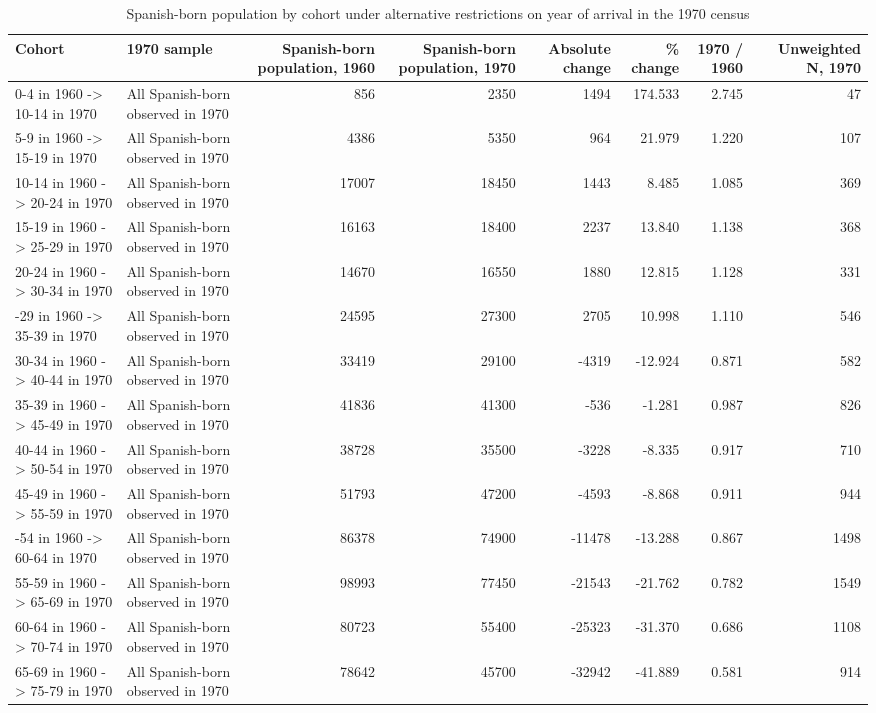 \begin{table}

\caption{Spanish-born population by cohort under alternative restrictions on year of arrival in the 1970 census}
\centering
\begin{tabular}[t]{llrrrrrr}
\toprule
Cohort & 1970 sample & Spanish-born population, 1960 & Spanish-born population, 1970 & Absolute change & \% change & 1970 / 1960 & Unweighted N, 1970\\
\midrule
0-4 in 1960 -> 10-14 in 1970 & All Spanish-born observed in 1970 & 856 & 2350 & 1494 & 174.533 & 2.745 & 47\\
5-9 in 1960 -> 15-19 in 1970 & All Spanish-born observed in 1970 & 4386 & 5350 & 964 & 21.979 & 1.220 & 107\\
10-14 in 1960 -> 20-24 in 1970 & All Spanish-born observed in 1970 & 17007 & 18450 & 1443 & 8.485 & 1.085 & 369\\
15-19 in 1960 -> 25-29 in 1970 & All Spanish-born observed in 1970 & 16163 & 18400 & 2237 & 13.840 & 1.138 & 368\\
20-24 in 1960 -> 30-34 in 1970 & All Spanish-born observed in 1970 & 14670 & 16550 & 1880 & 12.815 & 1.128 & 331\\
\addlinespace
25-29 in 1960 -> 35-39 in 1970 & All Spanish-born observed in 1970 & 24595 & 27300 & 2705 & 10.998 & 1.110 & 546\\
30-34 in 1960 -> 40-44 in 1970 & All Spanish-born observed in 1970 & 33419 & 29100 & -4319 & -12.924 & 0.871 & 582\\
35-39 in 1960 -> 45-49 in 1970 & All Spanish-born observed in 1970 & 41836 & 41300 & -536 & -1.281 & 0.987 & 826\\
40-44 in 1960 -> 50-54 in 1970 & All Spanish-born observed in 1970 & 38728 & 35500 & -3228 & -8.335 & 0.917 & 710\\
45-49 in 1960 -> 55-59 in 1970 & All Spanish-born observed in 1970 & 51793 & 47200 & -4593 & -8.868 & 0.911 & 944\\
\addlinespace
50-54 in 1960 -> 60-64 in 1970 & All Spanish-born observed in 1970 & 86378 & 74900 & -11478 & -13.288 & 0.867 & 1498\\
55-59 in 1960 -> 65-69 in 1970 & All Spanish-born observed in 1970 & 98993 & 77450 & -21543 & -21.762 & 0.782 & 1549\\
60-64 in 1960 -> 70-74 in 1970 & All Spanish-born observed in 1970 & 80723 & 55400 & -25323 & -31.370 & 0.686 & 1108\\
65-69 in 1960 -> 75-79 in 1970 & All Spanish-born observed in 1970 & 78642 & 45700 & -32942 & -41.889 & 0.581 & 914\\

\end{tabular}
\end{table}
